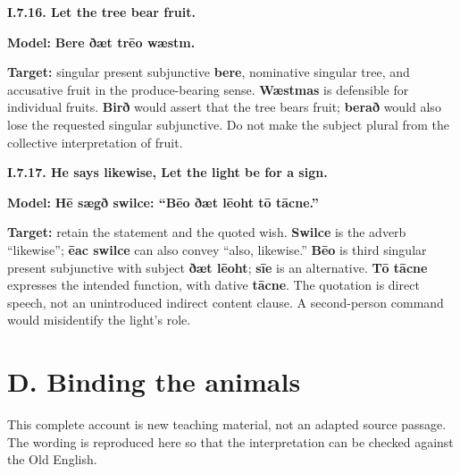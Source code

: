 \par\begin{minipage}{\linewidth}\raggedright
\textbf{I.7.16. Let the tree bear fruit.}

\textbf{Model:} \textbf{Bere ðæt trēo wæstm.}

\textbf{Target:} singular present subjunctive \textbf{bere}, nominative singular tree, and accusative fruit in the produce-bearing sense. \textbf{Wæstmas} is defensible for individual fruits. \textbf{Birð} would assert that the tree bears fruit; \textbf{berað} would also lose the requested singular subjunctive. Do not make the subject plural from the collective interpretation of fruit.

\end{minipage}\par\addvspace{4pt}

\par\begin{minipage}{\linewidth}\raggedright
\textbf{I.7.17. He says likewise, Let the light be for a sign.}

\textbf{Model:} \textbf{Hē sægð swilce: “Bēo ðæt lēoht tō tācne.”}

\textbf{Target:} retain the statement and the quoted wish. \textbf{Swilce} is the adverb “likewise”; \textbf{ēac swilce} can also convey “also, likewise.” \textbf{Bēo} is third singular present subjunctive with subject \textbf{ðæt lēoht}; \textbf{sīe} is an alternative. \textbf{Tō tācne} expresses the intended function, with dative \textbf{tācne}. The quotation is direct speech, not an unintroduced indirect content clause. A second-person command would misidentify the light’s role.

\end{minipage}\par\addvspace{4pt}

\section*{D. Binding the animals}

This complete account is new teaching material, not an adapted source passage. The wording is reproduced here so that the interpretation can be checked against the Old English.

